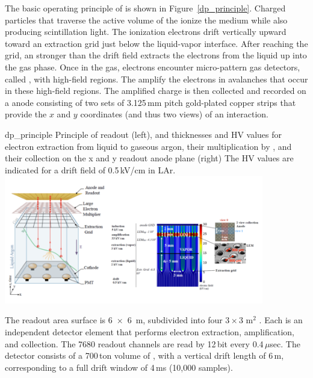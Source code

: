 \documentclass[../main-v1.tex]{subfiles}
\begin{document}
The basic operating principle of  is shown in Figure~\ref{dp_principle}. Charged particles that traverse the active volume of the  ionize the medium while also producing scintillation
light. The ionization electrons drift vertically upward %
toward an extraction grid just below the liquid-vapor interface. 
After reaching the grid,
an \efield stronger than the drift field extracts the electrons from the liquid up into the gas phase.
Once in the gas, electrons encounter micro-pattern gas detectors, called , with high-field regions. The  amplify the electrons in avalanches that occur in these
high-field regions. The amplified charge is then collected and recorded on a \twod anode consisting
of two sets of 3.125\,mm pitch gold-plated copper strips that provide the $x$ and $y$ coordinates (and
thus two views) of an interaction.   

\begin{dunefigure}
{dp_principle} %
{Principle of  readout (left), and thicknesses and HV values for electron extraction from liquid to gaseous argon, their
multiplication by , and their collection on the x and y readout anode plane (right) The HV values are
indicated for a drift field of 0.5\,kV/cm in LAr.}
\includegraphics[width=0.85\textwidth]{graphics/IntroFigures/Fig_11_protodune-dp-principle.png}
\end{dunefigure}

The readout area surface is \SI{6x6}{m}, subdivided into four $3\times3$ m$^2$  . Each  is an independent detector element %
that performs electron extraction, amplification, and collection. 
The 7680 readout channels are read by   12\,bit  every 0.4\,$\mu$sec. 
The  detector   consists of a 700\,ton volume of , with  a vertical drift length of 6\,m, corresponding to a full drift window of 4\,ms (10,000 samples).
\end{document}
